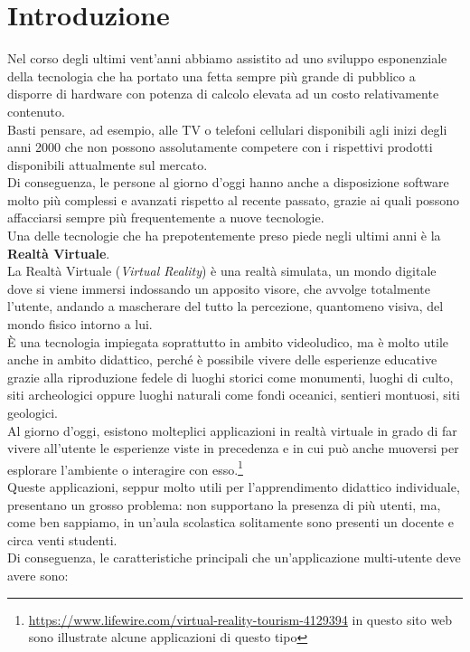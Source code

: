 \chapter{Introduzione}
Nel corso degli ultimi vent'anni abbiamo assistito ad uno sviluppo esponenziale della tecnologia che ha portato una fetta sempre più grande di pubblico a disporre di hardware con potenza di calcolo elevata ad un costo relativamente contenuto.
\\Basti pensare, ad esempio, alle TV o telefoni cellulari disponibili agli inizi degli anni 2000 che non possono assolutamente competere con i rispettivi prodotti disponibili attualmente sul mercato.
\\Di conseguenza, le persone al giorno d'oggi hanno anche a disposizione software molto più complessi e avanzati rispetto al recente passato, grazie ai quali possono affacciarsi sempre più frequentemente a nuove tecnologie.
\\Una delle tecnologie che ha prepotentemente preso piede negli ultimi anni è la \textbf{Realtà Virtuale}.
\\La Realtà Virtuale (\textit{Virtual Reality}) è una realtà simulata, un mondo digitale dove si viene immersi indossando un apposito visore, che avvolge totalmente l'utente, andando a mascherare del tutto la percezione, quantomeno visiva, del mondo fisico intorno a lui.
\\È una tecnologia impiegata soprattutto in ambito videoludico, ma è molto utile anche in ambito didattico, perché è possibile vivere delle esperienze educative grazie alla riproduzione fedele di luoghi storici come monumenti, luoghi di culto, siti archeologici oppure luoghi naturali come fondi oceanici, sentieri montuosi, siti geologici.
\\Al giorno d'oggi, esistono molteplici applicazioni in realtà virtuale in grado di far vivere all'utente le esperienze viste in precedenza e in cui può anche muoversi per esplorare l'ambiente o interagire con esso.\footnote{\url{https://www.lifewire.com/virtual-reality-tourism-4129394} in questo sito web sono illustrate alcune applicazioni di questo tipo}
\\Queste applicazioni, seppur molto utili per l'apprendimento didattico individuale, presentano un grosso problema: non supportano la presenza di più utenti, ma, come ben sappiamo, in un'aula scolastica solitamente sono presenti un docente e circa venti studenti. 
\\Di conseguenza, le caratteristiche principali che un'applicazione multi-utente deve avere sono:
